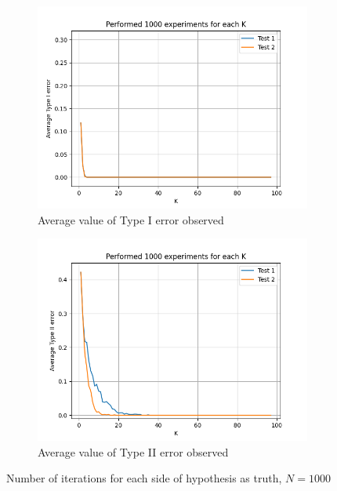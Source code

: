 \documentclass[fleqn, 11pt]{article}
\begin{document}
\vspace{30pt}
\begin{figure}[H]
    \centering
    \begin{subfigure}[H]{0.49\textwidth}
        \centering
        \includegraphics[width=\textwidth]{P3/type1_1000.png}
        \caption[]{Average value of Type I error observed}
    \end{subfigure}
    \begin{subfigure}[H]{0.49\textwidth}
        \centering
        \includegraphics[width=\textwidth]{P3/type2_1000.png}
        \caption[]{Average value of Type II error observed}
    \end{subfigure}
    \caption{Number of iterations for each side of hypothesis as truth, $N = 1000$}
\end{figure}
\end{document}
